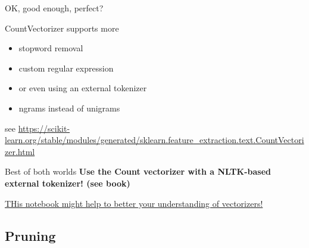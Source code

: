 \documentclass[handout]{beamer}
\begin{document}


\begin{frame}{OK, good enough, perfect?}
	\begin{block}{CountVectorizer supports more}
		\begin{itemize}
			\item stopword removal
			\item custom regular expression
			\item or even using an external tokenizer
			\item ngrams instead of unigrams
		\end{itemize}
	\end{block}
	\tiny{see \url{https://scikit-learn.org/stable/modules/generated/sklearn.feature\_extraction.text.CountVectorizer.html}}
	
	\pause
	\begin{alertblock}{Best of both worlds}
		\textbf{Use the Count vectorizer with a NLTK-based external tokenizer! (see book)}
	\end{alertblock}
\href{https://github.com/uva-cw-ccs2/2425s2/blob/main/week02/exercise-lecture/Understanding_vectorizers.ipynb}{THis notebook might help to better your understanding of vectorizers!}  
\end{frame}


\subsection{Pruning}
\end{document}
